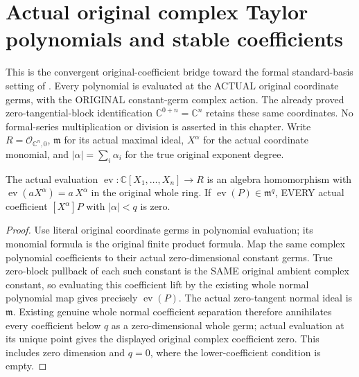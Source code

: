 \section{Actual original complex Taylor polynomials and stable coefficients}

This is the convergent original-coefficient bridge toward the formal
standard-basis setting of \cite[\S7]{bierstone-milman97-invent-math}.
Every polynomial is evaluated at the ACTUAL original coordinate germs,
with the ORIGINAL constant-germ complex action. The already proved
zero-tangential-block identification $\mathbb C^{0+n}=\mathbb C^n$
retains these same coordinates. No formal-series multiplication or division
is asserted in this chapter.
Write $R=\mathcal O_{\mathbb C^n,0}$, $\mathfrak m$ for its actual
maximal ideal, $X^\alpha$ for the actual coordinate monomial, and
$|\alpha|=\sum_i\alpha_i$ for the true original exponent degree.

\begin{lemma}
\label{hir:actual-original-polynomial-low-coefficient-separation}
\leanok
The actual evaluation $\operatorname{ev}:\mathbb C[X_1,\ldots,X_n]\to R$
is an algebra homomorphism with
$\operatorname{ev}(aX^\alpha)=a\,X^\alpha$ in the original whole ring.
If $\operatorname{ev}(P)\in\mathfrak m^q$, EVERY actual coefficient
$[X^\alpha]P$ with $|\alpha|<q$ is zero.
\end{lemma}
\begin{proof}
Use literal original coordinate germs in polynomial evaluation; its
monomial formula is the original finite product formula. Map the same
complex polynomial coefficients to their actual zero-dimensional
constant germs. True zero-block pullback of each such constant is the
SAME original ambient complex constant, so evaluating this coefficient
lift by the existing whole normal polynomial map gives precisely
$\operatorname{ev}(P)$. The actual zero-tangent normal ideal is
$\mathfrak m$. Existing genuine whole normal coefficient separation
therefore annihilates every coefficient below $q$ as a zero-dimensional
whole germ; actual evaluation at its unique point gives the displayed
original complex coefficient zero. This includes zero dimension and
$q=0$, where the lower-coefficient condition is empty.
\end{proof}


